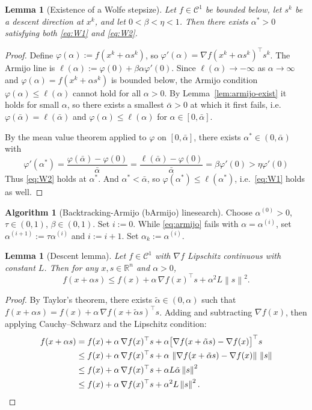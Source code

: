 \documentclass[11pt,a4paper]{report}
\theoremstyle{plain}
\newtheorem{lemma}[theorem]{Lemma}
\theoremstyle{definition}
\newtheorem{algorithm}[theorem]{Algorithm}
\newcommand{\R}{\mathbb{R}}
\newcommand{\norm}[1]{\left\lVert#1\right\rVert}
\newcommand{\grad}{\nabla}
\newcommand{\trans}{^{\top}}
\begin{document}
\begin{lemma}[Existence of a Wolfe stepsize]\label{lem:wolfe-exist}
Let $f\in\mathcal{C}^{1}$ be bounded below, let $s^{k}$ be a descent direction at
$x^{k}$, and let $0<\beta<\eta<1$. Then there exists $\alpha^{*}>0$ satisfying both
\eqref{eq:W1} and \eqref{eq:W2}.
\end{lemma}
\begin{proof}
Define $\varphi(\alpha):=f(x^{k}+\alpha s^{k})$, so $\varphi'(\alpha)=\grad f(x^{k}+\alpha s^{k})\trans s^{k}$. The Armijo line is $\ell(\alpha):=\varphi(0)+\beta\alpha\varphi'(0)$. Since $\ell(\alpha)\to-\infty$ as $\alpha\to\infty$ and $\varphi(\alpha)=f(x^{k}+\alpha s^{k})$ is bounded below, the Armijo condition $\varphi(\alpha)\le\ell(\alpha)$ cannot hold for all $\alpha>0$. By Lemma~\ref{lem:armijo-exist} it holds for small $\alpha$, so there exists a smallest $\bar{\alpha}>0$ at which it first fails, i.e.\
$\varphi(\bar{\alpha})=\ell(\bar{\alpha})$ and $\varphi(\alpha)\le\ell(\alpha)$ for $\alpha\in[0,\bar{\alpha}]$.

By the mean value theorem applied to $\varphi$ on $[0,\bar{\alpha}]$, there exists $\alpha^{*}\in(0,\bar{\alpha})$ with
\[
\varphi'(\alpha^{*})
=\frac{\varphi(\bar{\alpha})-\varphi(0)}{\bar{\alpha}}
=\frac{\ell(\bar{\alpha})-\varphi(0)}{\bar{\alpha}}
=\beta\varphi'(0) > \eta \varphi'(0)
\]
Thus \eqref{eq:W2} holds at $\alpha^{*}$. And $\alpha^{*}<\bar{\alpha}$, so $\varphi(\alpha^{*})\le\ell(\alpha^{*})$, i.e.\ \eqref{eq:W1} holds as well.
\end{proof}

\begin{algorithm}[Backtracking-Armijo (bArmijo) linesearch]\label{alg:bArmijo}
Choose $\alpha^{(0)}>0$, $\tau\in(0,1)$, $\beta\in(0,1)$. Set $i:=0$.
While \eqref{eq:armijo} fails with $\alpha=\alpha^{(i)}$, set
$\alpha^{(i+1)}:=\tau\alpha^{(i)}$ and $i:=i+1$. Set $\alpha_{k}:=\alpha^{(i)}$.
\end{algorithm}

\begin{lemma}[Descent lemma]\label{lem:descent-lemma}
Let $f\in\mathcal{C}^{1}$ with $\grad f$ Lipschitz continuous with constant $L$.
Then for any $x,s\in\R^{n}$ and $\alpha>0$,
\[
f(x+\alpha s)\le f(x)+\alpha\,\grad f(x)\trans s+\alpha^{2}L\norm{s}^{2}.
\]
\end{lemma}
\begin{proof}
By Taylor's theorem, there exists $\tilde{\alpha}\in(0,\alpha)$ such that
$f(x+\alpha s)=f(x)+\alpha\,\grad f(x+\tilde{\alpha}s)\trans s$. Adding and
subtracting $\grad f(x)$, then applying Cauchy--Schwarz and the Lipschitz condition:
\begin{align*}
f(x+\alpha s)
&=f(x)+\alpha\,\grad f(x)\trans s+\alpha\bigl[\grad f(x+\tilde{\alpha}s)-\grad f(x)\bigr]\trans s\\
&\le f(x)+\alpha\,\grad f(x)\trans s+\alpha\,\norm{\grad f(x+\tilde{\alpha}s)-\grad f(x)}\,\norm{s}\\
&\le f(x)+\alpha\,\grad f(x)\trans s+\alpha L\tilde{\alpha}\norm{s}^{2} \\
&\le f(x)+\alpha\,\grad f(x)\trans s+\alpha^{2}L\norm{s}^{2}.\qedhere
\end{align*}
\end{proof}
\end{document}
